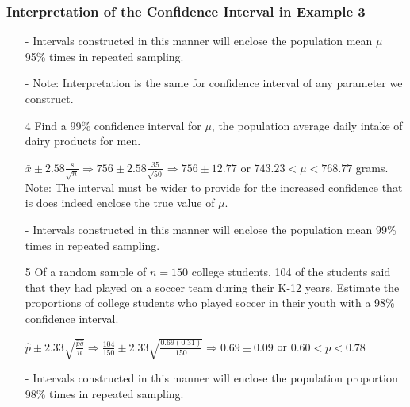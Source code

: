 \documentclass[12pt, letterpaper]{article}
\begin{document}
            \subsubsection*{Interpretation of the Confidence Interval in Example 3}
                \begin{itemize}
                    \item[-] Intervals constructed in this manner will enclose the population mean $\mu$ 95\% times in repeated sampling.
                    \item[-] Note: Interpretation is the same for confidence interval of any parameter we construct.
                \end{itemize}
                \begin{itemize}
                    \item[4] Find a 99\% confidence interval for $\mu$, the population average daily intake of dairy products for men.
                    \begin{mdframed}[leftmargin=0.5cm, rightmargin=0.5cm]
                        $\bar{x} \pm 2.58 \frac{s}{\sqrt{n}} \Rightarrow 756 \pm 2.58 \frac{35}{\sqrt{50}} \Rightarrow 756\pm 12.77$ or $743.23 < \mu < 768.77$ grams.
                        Note: The interval must be wider to provide for the increased confidence that is does indeed enclose the true value of $\mu$.
                    \end{mdframed}
                    \item[-] Intervals constructed in this manner will enclose the population mean 99\% times in repeated sampling.
                    \item[5] Of a random sample of $n = 150$ college students, 104 of the students said that they had played on a soccer team during their K-12 years. Estimate the proportions of college students who played soccer in their youth with a 98\% confidence interval.
                    \begin{mdframed}[leftmargin=0.5cm, rightmargin=0.5cm]
                        $\hat{p} \pm 2.33\sqrt{\frac{\hat{p}\hat{q}}{n}} \Rightarrow \frac{104}{150} \pm 2.33 \sqrt{\frac{0.69(0.31)}{150}} \Rightarrow 0.69\pm 0.09$ or $0.60 < p < 0.78$
                    \end{mdframed}
                    \item[-] Intervals constructed in this manner will enclose the population proportion 98\% times in repeated sampling.
                \end{itemize}
\end{document}
